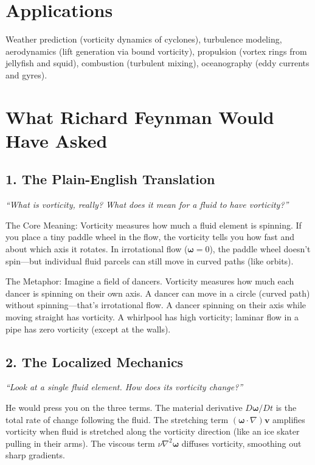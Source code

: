 \section*{Applications}

Weather prediction (vorticity dynamics of cyclones), turbulence modeling, aerodynamics (lift generation via bound vorticity), propulsion (vortex rings from jellyfish and squid), combustion (turbulent mixing), oceanography (eddy currents and gyres).
\section*{What Richard Feynman Would Have Asked}

\subsection*{1. The Plain-English Translation}
\textit{``What is vorticity, really? What does it mean for a fluid to have vorticity?''}

The Core Meaning: Vorticity measures how much a fluid element is spinning. If you place a tiny paddle wheel in the flow, the vorticity tells you how fast and about which axis it rotates. In irrotational flow ($\boldsymbol{\omega} = 0$), the paddle wheel doesn't spin---but individual fluid parcels can still move in curved paths (like orbits).

The Metaphor: Imagine a field of dancers. Vorticity measures how much each dancer is spinning on their own axis. A dancer can move in a circle (curved path) without spinning---that's irrotational flow. A dancer spinning on their axis while moving straight has vorticity. A whirlpool has high vorticity; laminar flow in a pipe has zero vorticity (except at the walls).

\subsection*{2. The Localized Mechanics}
\textit{``Look at a single fluid element. How does its vorticity change?''}

He would press you on the three terms. The material derivative $D\boldsymbol{\omega}/Dt$ is the total rate of change following the fluid. The stretching term $(\boldsymbol{\omega} \cdot \nabla)\mathbf{v}$ amplifies vorticity when fluid is stretched along the vorticity direction (like an ice skater pulling in their arms). The viscous term $\nu \nabla^2 \boldsymbol{\omega}$ diffuses vorticity, smoothing out sharp gradients.

